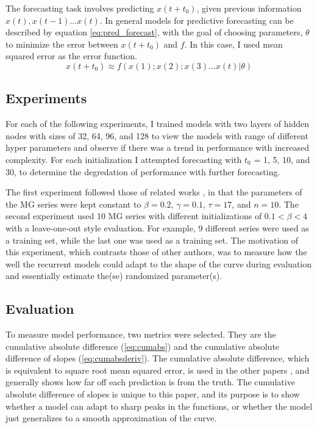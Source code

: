 \documentclass[11pt]{article}
\begin{document}
The forecasting task involves predicting $x(t+t_0)$, given previous
information $x(t), x(t-1) ... x(t)$. In general models for predictive forecasting
can be described by equation \ref{eq:pred_forecast}, with the goal of
choosing parameters, $\theta$ to minimize the error between $x(t+t_0)$
and $f$. In this case, I used mean squared error as the error function.
\begin{equation}
  x(t+t_0) \approx f(x(1);x(2);x(3)...x(t) | \theta)
  \label{eq:pred_forecast}
\end{equation}

\subsection{Experiments}
For each of the following
experiments, I
trained models with two layers of hidden nodes with sizes of 32, 64, 96, and 128 to
view the models with range of different hyper parameters and observe if
there was a trend in performance with increased complexity. For each
initialization I attempted forecasting with $t_0$ = 1, 5, 10, and 30,
to determine the degredation of performance with further forecasting.

The first experiment followed those of related works \cite{}, in that the
parameters of the MG series were kept constant to $\beta = 0.2$,
$\gamma = 0.1$, $\tau = 17$, and $n = 10$. The second experiment used 10 MG series with different
initializations of $0.1 < \beta < 4$ with a leave-one-out style
evaluation. For example, 9 different series were used as a training
set, while the last one was used as a training set. The motivation of
this experiment, which contrasts those of other authors, was to measure
how the well the recurrent models could adapt to the shape of the curve during
evaluation and essentially estimate the(se) randomized parameter(s).

\subsection{Evaluation}
To measure model performance, two metrics were selected. They are
the cumulative absolute difference (\ref{eq:cumabs}) and the
cumulative absolute difference of slopes
(\ref{eq:cumabsderiv}). The cumulative absolute difference, which is
equivalent to square root mean squared error, is used in the other
papers \cite{other}, and generally shows how far off each prediction
is from the truth. The cumulative absolute difference of slopes is
unique to this paper, and its purpose is to show whether a model can
adapt to sharp peaks in the functions, or whether the model just
generalizes to a smooth approximation of the curve.
\end{document}
